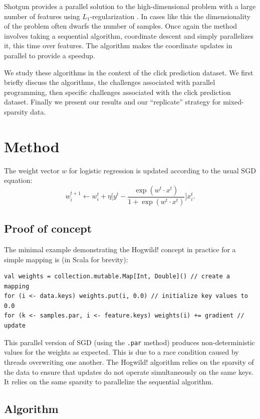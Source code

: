 \documentclass{article} %
\begin{document}
Shotgun provides a parallel solution to the high-dimensional problem with a large number of features using $L_1$-regularization \cite{ng2004feature}. In cases like this the dimensionality of the problem often dwarfs the number of samples. Once again the method involves taking a sequential algorithm, coordinate descent and simply parallelizes it, this time over features. The algorithm makes the coordinate updates in parallel to provide a speedup.

We study these algorithms in the context of the click prediction dataset. We first briefly discuss the algorithms, the challenges associated with parallel programming, then specific challenges associated with the click prediction dataset. Finally we present our results and our ``replicate'' strategy for mixed-sparsity data.

\section{Method}
The weight vector $w$ for logistic regression is updated according to the usual SGD equation:
\begin{equation}
w_i^{t+1} \leftarrow w_i^t + \eta \bigg[y^t - \frac{\exp{(w^t \cdot x^t)}}{1 + \exp{(w^t \cdot x^t)}} \bigg]x_i^t.
\end{equation}

\subsection{Proof of concept}
The minimal example demonstrating the Hogwild! concept in practice for a simple mapping is (in Scala for brevity):
\begin{lstlisting}
val weights = collection.mutable.Map[Int, Double]() // create a mapping
for (i <- data.keys) weights.put(i, 0.0) // initialize key values to 0.0
for (k <- samples.par, i <- feature.keys) weights(i) += gradient // update
\end{lstlisting}
This parallel version of SGD (using the \verb+.par+ method) produces non-deterministic values for the weights as expected. This is due to a race condition caused by threads overwriting one another. The Hogwild! algorithm relies on the sparsity of the data to ensure that updates do not operate simultaneously on the same keys. It relies on the same sparsity to parallelize the sequential algorithm.

\subsection{Algorithm}
\end{document}
